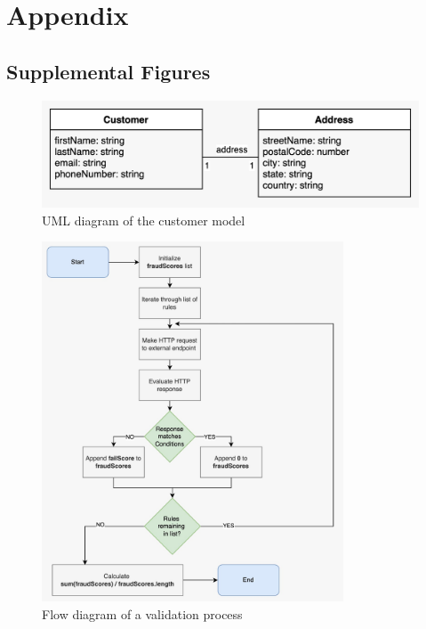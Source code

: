 \appendix
{}

\chapter{Appendix}


 \section{Supplemental Figures}

  \begin{figure}[!ht]
   \includegraphics[width=\textwidth]{diagrams/entity_customer.jpeg}
   \caption{UML diagram of the customer model}
   \label{fig:customer_uml}
  \end{figure}
  
  \begin{figure}[!ht]
    \centering
    \includegraphics[width=0.8\textwidth]{diagrams/flow_validation_process.jpeg}
    \caption{Flow diagram of a validation process}
    \label{fig:flow_validation}
  \end{figure}

